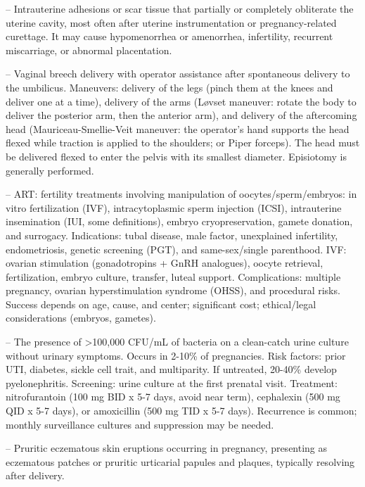 -- Intrauterine adhesions or scar tissue that partially or completely obliterate the uterine cavity, most often after uterine instrumentation or pregnancy-related curettage. It may cause hypomenorrhea or amenorrhea, infertility, recurrent miscarriage, or abnormal placentation.

-- Vaginal breech delivery with operator assistance after spontaneous delivery to the umbilicus. Maneuvers: delivery of the legs (pinch them at the knees and deliver one at a time), delivery of the arms (Løvset maneuver: rotate the body to deliver the posterior arm, then the anterior arm), and delivery of the aftercoming head (Mauriceau-Smellie-Veit maneuver: the operator's hand supports the head flexed while traction is applied to the shoulders; or Piper forceps). The head must be delivered flexed to enter the pelvis with its smallest diameter. Episiotomy is generally performed.

-- ART: fertility treatments involving manipulation of oocytes/sperm/embryos: in vitro fertilization (IVF), intracytoplasmic sperm injection (ICSI), intrauterine insemination (IUI, some definitions), embryo cryopreservation, gamete donation, and surrogacy. Indications: tubal disease, male factor, unexplained infertility, endometriosis, genetic screening (PGT), and same-sex/single parenthood. IVF: ovarian stimulation (gonadotropins + GnRH analogues), oocyte retrieval, fertilization, embryo culture, transfer, luteal support. Complications: multiple pregnancy, ovarian hyperstimulation syndrome (OHSS), and procedural risks. Success depends on age, cause, and center; significant cost; ethical/legal considerations (embryos, gametes).

-- The presence of >100,000 CFU/mL of bacteria on a clean-catch urine culture without urinary symptoms. Occurs in 2-10\% of pregnancies. Risk factors: prior UTI, diabetes, sickle cell trait, and multiparity. If untreated, 20-40\% develop pyelonephritis. Screening: urine culture at the first prenatal visit. Treatment: nitrofurantoin (100 mg BID x 5-7 days, avoid near term), cephalexin (500 mg QID x 5-7 days), or amoxicillin (500 mg TID x 5-7 days). Recurrence is common; monthly surveillance cultures and suppression may be needed.

-- Pruritic eczematous skin eruptions occurring in pregnancy, presenting as eczematous patches or pruritic urticarial papules and plaques, typically resolving after delivery.

